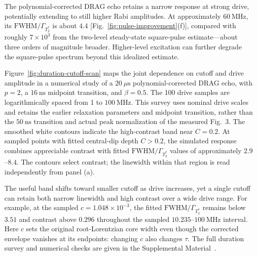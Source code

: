 The polynomial-corrected DRAG echo retains a narrow response at strong drive,
potentially extending to still higher Rabi amplitudes. At approximately
$60~\mathrm{MHz}$, its $\mathrm{FWHM}/\Gamma_{T_2^*}$ is about $4.4$
[Fig.~\ref{fig:pulse-improvement}(f)], compared with roughly
$7\times10^3$ from the two-level steady-state square-pulse estimate---about
three orders of magnitude broader. Higher-level excitation can further degrade
the square-pulse spectrum beyond this idealized estimate.

Figure~\ref{fig:duration-cutoff-scan} maps the joint dependence on cutoff
and drive amplitude in a numerical study of a
$20~\mu\mathrm{s}$ polynomial-corrected DRAG echo, with $p=2$, a
$16~\mathrm{ns}$ midpoint transition, and $\beta=0.5$.
The 100 drive samples are logarithmically spaced
from 1 to $100~\mathrm{MHz}$. This survey uses nominal drive scales
and retains the earlier relaxation parameters and midpoint transition,
rather than the $50~\mathrm{ns}$ transition and actual peak normalization
of the measured Fig.~3.
The smoothed white contours indicate the high-contrast band near $C=0.2$.
At sampled points with fitted central-dip depth $C>0.2$, the simulated response
combines appreciable contrast
with fitted $\mathrm{FWHM}/\Gamma_{T_2^*}$ values of approximately $2.9$--$8.4$.
The contours select contrast; the linewidth within that region is read
independently from panel (a).

The useful band shifts toward smaller cutoff as drive increases, yet a
single cutoff can retain both narrow linewidth and high contrast over a
wide drive range. For example, at the sampled
$c=1.048\times10^{-3}$, the fitted $\mathrm{FWHM}/\Gamma_{T_2^*}$ remains below $3.51$
and contrast above $0.296$ throughout the sampled $10.235$--$100~\mathrm{MHz}$
interval. Here $c$ sets the original root-Lorentzian core width even though
the corrected envelope vanishes at its endpoints: changing $c$ also
changes $\tau$. The full duration survey and numerical checks are given
in the Supplemental Material~\cite{SupplementalMaterial}.


